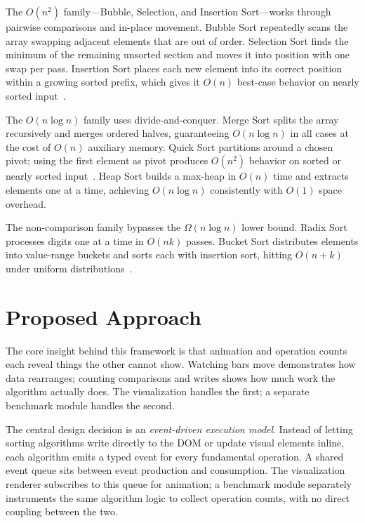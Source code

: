 \documentclass[conference]{IEEEtran}
\begin{document}
The $O(n^2)$ family---Bubble, Selection, and Insertion Sort---works through
pairwise comparisons and in-place movement. Bubble Sort repeatedly scans the
array swapping adjacent elements that are out of order. Selection Sort finds the
minimum of the remaining unsorted section and moves it into position with one
swap per pass. Insertion Sort places each new element into its correct position
within a growing sorted prefix, which gives it $O(n)$ best-case behavior on
nearly sorted input~\cite{cormen2009}.

The $O(n \log n)$ family uses divide-and-conquer. Merge Sort splits the array
recursively and merges ordered halves, guaranteeing $O(n \log n)$ in all cases
at the cost of $O(n)$ auxiliary memory. Quick Sort partitions around a chosen
pivot; using the first element as pivot produces $O(n^2)$ behavior on sorted or
nearly sorted input~\cite{hoare1962}. Heap Sort builds a max-heap in $O(n)$
time and extracts elements one at a time, achieving $O(n \log n)$ consistently
with $O(1)$ space overhead.

The non-comparison family bypasses the $\Omega(n \log n)$ lower bound. Radix
Sort processes digits one at a time in $O(nk)$ passes. Bucket Sort distributes
elements into value-range buckets and sorts each with insertion sort, hitting
$O(n+k)$ under uniform distributions~\cite{knuth1998}.

\section{Proposed Approach}

The core insight behind this framework is that animation and operation counts
each reveal things the other cannot show. Watching bars move demonstrates how
data rearranges; counting comparisons and writes shows how much work the
algorithm actually does. The visualization handles the first; a separate
benchmark module handles the second.

The central design decision is an \emph{event-driven execution model}. Instead
of letting sorting algorithms write directly to the DOM or update visual
elements inline, each algorithm emits a typed event for every fundamental
operation. A shared event queue sits between event production and consumption.
The visualization renderer subscribes to this queue for animation; a benchmark
module separately instruments the same algorithm logic to collect operation
counts, with no direct coupling between the two.
\end{document}
